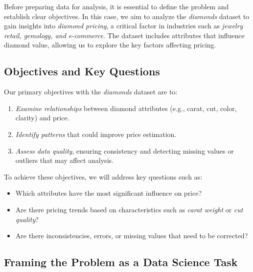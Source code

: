 \documentclass[
]{book}
\providecommand{\tightlist}{%
  \setlength{\itemsep}{0pt}\setlength{\parskip}{0pt}}
\theoremstyle{definition}
\theoremstyle{definition}
\theoremstyle{definition}
\theoremstyle{definition}
\theoremstyle{remark}
\begin{document}
Before preparing data for analysis, it is essential to define the problem and establish clear objectives. In this case, we aim to analyze the \emph{diamonds} dataset to gain insights into \emph{diamond pricing}, a critical factor in industries such as \emph{jewelry retail, gemology, and e-commerce}. The dataset includes attributes that influence diamond value, allowing us to explore the key factors affecting pricing.

\subsection*{Objectives and Key Questions}\label{objectives-and-key-questions}

Our primary objectives with the \emph{diamonds} dataset are to:

\begin{enumerate}
\def\labelenumi{\arabic{enumi}.}
\tightlist
\item
  \emph{Examine relationships} between diamond attributes (e.g., carat, cut, color, clarity) and price.\\
\item
  \emph{Identify patterns} that could improve price estimation.\\
\item
  \emph{Assess data quality}, ensuring consistency and detecting missing values or outliers that may affect analysis.
\end{enumerate}

To achieve these objectives, we will address key questions such as:

\begin{itemize}
\tightlist
\item
  Which attributes have the most significant influence on price?\\
\item
  Are there pricing trends based on characteristics such as \emph{carat weight} or \emph{cut quality}?\\
\item
  Are there inconsistencies, errors, or missing values that need to be corrected?
\end{itemize}

\subsection*{Framing the Problem as a Data Science Task}\label{framing-the-problem-as-a-data-science-task}
\end{document}
